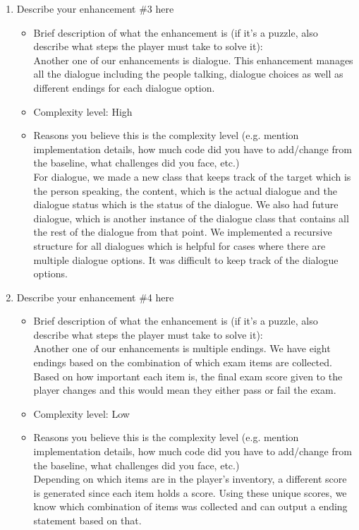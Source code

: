 \documentclass[11pt]{article}
\begin{document}
\begin{enumerate}
\begin{itemize}
\end{itemize}
 
\item Describe your enhancement \#3 here
	\begin{itemize}
	\item Brief description of what the enhancement is (if it's a puzzle, also describe what steps the player must take to solve it):
 \\Another one of our enhancements is dialogue. This enhancement manages all the dialogue including the people talking, dialogue choices as well as different endings for each dialogue option.
	\item Complexity level: High
	\item Reasons you believe this is the complexity level (e.g. mention implementation details, how much code did you have to add/change from the baseline, what challenges did you face, etc.)
 \\For dialogue, we made a new class that keeps track of the target which is the person speaking, the content, which is the actual dialogue and the dialogue status which is the status of the dialogue. We also had future dialogue, which is another instance of the dialogue class that contains all the rest of the dialogue from that point. We implemented a recursive structure for all dialogues which is helpful for cases where there are multiple dialogue options. It was difficult to keep track of the dialogue options.
	\end{itemize}
 
 \item Describe your enhancement \#4 here
	\begin{itemize}
	\item Brief description of what the enhancement is (if it's a puzzle, also describe what steps the player must take to solve it):
 \\Another one of our enhancements is multiple endings. We have eight endings based on the combination of which exam items are collected. Based on how important each item is, the final exam score given to the player changes and this would mean they either pass or fail the exam. 
	\item Complexity level: Low
	\item Reasons you believe this is the complexity level (e.g. mention implementation details, how much code did you have to add/change from the baseline, what challenges did you face, etc.)
 \\Depending on which items are in the player's inventory, a different score is generated since each item holds a score. Using these unique scores, we know which combination of items was collected and can output a ending statement based on that. 
	\end{itemize}



\end{enumerate}
\end{document}
